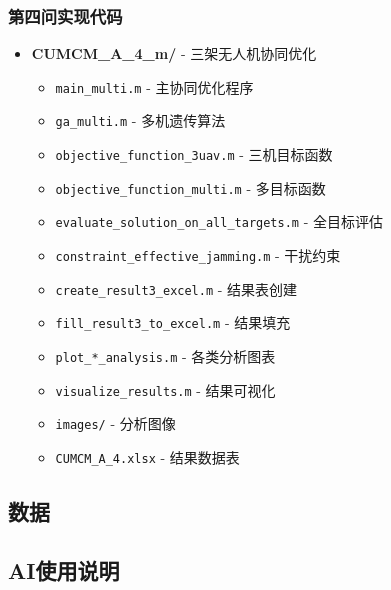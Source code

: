 \subsubsection{第四问实现代码}
\begin{itemize}
    \item \textbf{CUMCM\_A\_4\_m/} - 三架无人机协同优化
    \begin{itemize}
        \item \texttt{main\_multi.m} - 主协同优化程序
        \item \texttt{ga\_multi.m} - 多机遗传算法
        \item \texttt{objective\_function\_3uav.m} - 三机目标函数
        \item \texttt{objective\_function\_multi.m} - 多目标函数
        \item \texttt{evaluate\_solution\_on\_all\_targets.m} - 全目标评估
        \item \texttt{constraint\_effective\_jamming.m} - 干扰约束
        \item \texttt{create\_result3\_excel.m} - 结果表创建
        \item \texttt{fill\_result3\_to\_excel.m} - 结果填充
        \item \texttt{plot\_*\_analysis.m} - 各类分析图表
        \item \texttt{visualize\_results.m} - 结果可视化
        \item \texttt{images/} - 分析图像
        \item \texttt{CUMCM\_A\_4.xlsx} - 结果数据表
    \end{itemize}
\end{itemize}

\subsection{数据}

\subsection{AI使用说明}